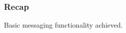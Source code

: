 \documentclass[
	aspectratio=169,
	xetex,
]{beamer}
\begin{document}



\begin{frame}
	\frametitle{Recap}
	Basic messaging functionality achieved.
\end{frame}
\end{document}
